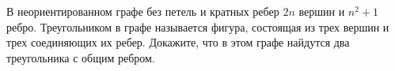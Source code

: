 \documentclass{article}
\begin{document}
В неориентированном графе без петель и кратных ребер $2n$ вершин и $n^2+1$ ребро.
Треугольником в графе называется фигура, состоящая из трех вершин и трех соединяющих их ребер. Докажите, что в этом графе найдутся два треугольника с общим ребром.
\end{document}
